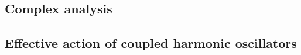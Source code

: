 % 


% 

% 
% 
% 


% 
% 

% 
% 


\setcounter{section}{5}
\setcounter{subsection}{0}
\subsection{Complex analysis}

\subsection{Effective action of coupled harmonic oscillators}





% 








